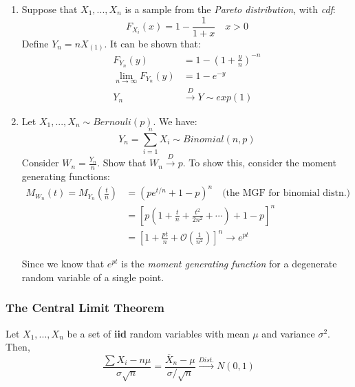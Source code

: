 \documentclass{article}
\newcommand{\ord}[1]{X_{(#1)}}
\begin{document}
\begin{enumerate}
    \item Suppose that $X_1,...,X_n$ is a sample from the \textit{Pareto distribution}, with \textit{cdf}:
    \begin{equation*}
        F_{X_i}(x) = 1-\frac{1}{1+x} \quad x >0
    \end{equation*}
    Define $Y_n = n\ord{1}$. It can be shown that:
    \begin{equation*}
        \begin{split}
            F_{Y_n}(y) &= 1 - \left(1 + \frac{y}{n} \right)^{-n}\\
            \lim_{n\to\infty} F_{Y_n}(y) &= 1-e^{-y}\\
            Y_n &\xrightarrow{D} Y\sim exp(1)
        \end{split}
    \end{equation*}
    
    \item Let $X_1,...,X_n\sim Bernouli(p)$. We have:
    \begin{equation*}
        Y_n = \sum_{i=1}^n X_i \sim Binomial(n,p)
    \end{equation*}
    Consider $W_n = \frac{Y_n}{n}$. Show that $W_n \xrightarrow{D} p$. To show this, consider the moment generating functions:
    \begin{equation*}
    \begin{split}
        M_{W_n}(t) = M_{Y_n}\left(\frac{t}{n}\right) &= \left(pe^{t/n} + 1-p \right)^n \quad \text{(the MGF for binomial distn.)}\\
        &= \left[p\left(1 + \frac{t}{n} + \frac{t^2}{2n^2} + \cdots \right) + 1-p \right]^n\\
        &= \left[1 + \frac{pt}{n} + \mathcal{O}\left(\frac{1}{n^2}\right) \right]^n \rightarrow e^{pt}
    \end{split}
    \end{equation*}
    
    Since we know that $e^{pt}$ is the \textit{moment generating function} for a degenerate random variable of a single point.
\end{enumerate}

\subsubsection{The Central Limit Theorem}

Let $X_1,...,X_n$ be a set of \textbf{iid} random variables with mean $\mu$ and variance $\sigma^2$. Then,
\begin{equation*}
    \frac{\sum X_i - n\mu}{\sigma\sqrt{n}} = \frac{\overline{X}_n - \mu}{\sigma/\sqrt{n}} \xrightarrow{Dist.} N(0,1)
\end{equation*}
\end{document}
